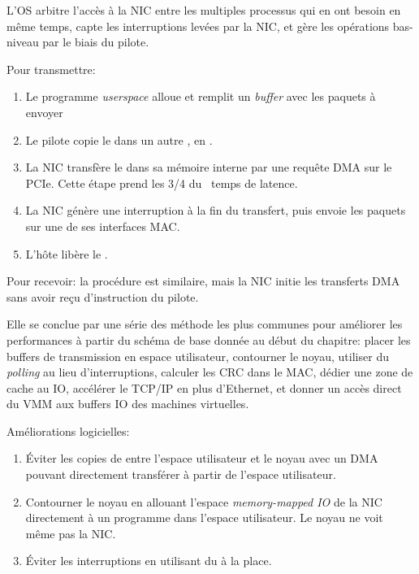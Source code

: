 L'OS arbitre l'accès à la NIC entre les multiples processus qui en ont besoin en même temps, capte les interruptions levées par la NIC, et gère les opérations bas-niveau par le biais du pilote.


Pour transmettre:
\begin{enumerate}
	\item{Le programme \emph{userspace} alloue et remplit un \emph{buffer} avec les paquets à envoyer}
	\item{Le pilote copie le  dans un autre , en . }
	\item{La NIC transfère le  dans sa mémoire interne par une requête DMA sur le PCIe. Cette étape prend les 3/4 du \
	temps de latence.}
	\item{La NIC génère une interruption à la fin du transfert, puis envoie les paquets sur une de ses interfaces MAC.}
	\item{L'hôte libère le \an{buffer} \an{kernel space}.}
\end{enumerate}

Pour recevoir: la procédure est similaire, mais la NIC initie les transferts DMA sans avoir reçu d'instruction du pilote.


Elle se conclue par une série des méthode les plus communes pour améliorer les performances à partir du schéma de base donnée au début du chapitre: placer les buffers de transmission en espace utilisateur, contourner le noyau, utiliser du \emph{polling} au lieu d'interruptions, calculer les CRC dans le MAC, dédier une zone de cache au IO, accélérer le TCP/IP en plus d'Ethernet, et donner un accès direct du VMM aux buffers IO des machines virtuelles.

Améliorations logicielles:
\begin{enumerate}
	\item{Éviter les copies de  entre l'espace utilisateur et le noyau avec un DMA pouvant directement transférer à partir de l'espace utilisateur.}
	\item{Contourner le noyau en allouant l'espace \emph{memory-mapped IO} de la NIC directement à un programme dans l'espace utilisateur. Le noyau ne voit même pas la NIC.}
	\item{Éviter les interruptions en utilisant du \an{polling} à la place.}
\end{enumerate}

